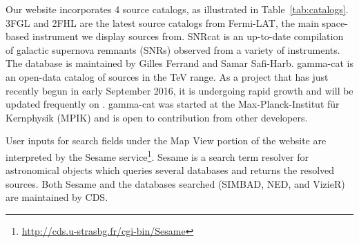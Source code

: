 Our website incorporates 4 source catalogs, as illustrated in Table~\ref{tab:catalogs}. 3FGL \cite{3fgl} and 2FHL \cite{2fhl} are the latest source catalogs from Fermi-LAT, the main space-based instrument we display sources from. SNRcat \cite{snrcat} is an up-to-date compilation of galactic supernova remnants (SNRs) observed from a variety of instruments. The database is maintained by Gilles Ferrand and Samar Safi-Harb. gamma-cat is an open-data catalog of sources in the TeV range. As a project that has just recently begun in early September 2016, it is undergoing rapid growth and will be updated frequently on \gammasky. gamma-cat was started at the Max-Planck-Institut f\"{u}r Kernphysik (MPIK) and is open to contribution from other developers.

User inputs for search fields under the Map View portion of the website are interpreted by the Sesame service\footnote[4]{\url{http://cds.u-strasbg.fr/cgi-bin/Sesame}}. Sesame is a search term resolver for astronomical objects which queries several databases and returns the resolved sources. Both Sesame and the databases searched (SIMBAD, NED, and VizieR) are maintained by CDS.

